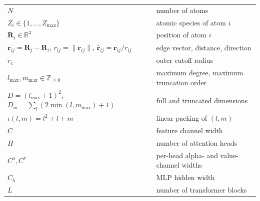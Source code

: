 \documentclass[11pt,a4paper]{article}
\newcommand{\R}{\mathbb{R}}
\newcommand{\Z}{\mathbb{Z}}
\newcommand{\bR}{\bm{R}}
\newcommand{\br}{\bm{r}}
\newcommand{\brh}{\hat{\bm{r}}}
\newcommand{\rcut}{r_{\mathrm{c}}}
\newcommand{\lmax}{l_{\max}}
\newcommand{\mmax}{m_{\max}}
\theoremstyle{plain}
\theoremstyle{definition}
\theoremstyle{remark}
\begin{document}
\begin{tabular}{ll}
    $N$                                                                        & number of atoms                                                                        \\
    $Z_i\in\{1,\dots,Z_{\max}\}$                                               & atomic species of atom $i$                                                             \\
    $\bR_i\in\R^3$                                                             & position of atom $i$                                                                   \\
    $\br_{ij}=\bR_j-\bR_i$, $r_{ij}=\|\br_{ij}\|$, $\brh_{ij}=\br_{ij}/r_{ij}$ & edge vector, distance, direction                                                       \\
    $\rcut$                                                                    & outer cutoff radius                                                                    \\
    $\lmax,\mmax\in\Z_{\geq 0}$                                                & maximum degree, maximum truncation order                                               \\
    $D=(\lmax+1)^2$, $D_m=\sum_l(2\min(l,\mmax)+1)$                            & full and truncated dimensions                                                          \\
    $\iota(l,m)=l^2+l+m$                                                       & linear packing of $(l,m)$                                                              \\
    $C$                                                                        & feature channel width                                                                  \\
    $H$                                                                        & number of attention heads                                                              \\
    $C^{\mathrm{a}},C^{\mathrm{v}}$                                            & per-head alpha- and value-channel widths                                               \\
    $C_h$                                                                      & MLP hidden width                                                                       \\
    $L$                                                                        & number of transformer blocks                                                           \\

\end{tabular}
\end{document}
